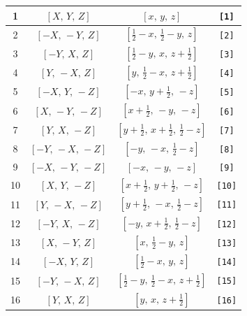 \documentclass[fleqn,8pt]{jsarticle}
\begin{document}
\begin{longtable}{cccc}
1 & $\left[ X,\, Y,\, Z \right]$ & $\left[ x,\, y,\, z \right]$ & {\tt [1]} \\ \hline
2 & $\left[ - X,\, - Y,\, Z \right]$ & $\left[ \frac{1}{2} - x,\, \frac{1}{2} - y,\, z \right]$ & {\tt [2]} \\ \hline
3 & $\left[ - Y,\, X,\, Z \right]$ & $\left[ \frac{1}{2} - y,\, x,\, z + \frac{1}{2} \right]$ & {\tt [3]} \\ \hline
4 & $\left[ Y,\, - X,\, Z \right]$ & $\left[ y,\, \frac{1}{2} - x,\, z + \frac{1}{2} \right]$ & {\tt [4]} \\ \hline
5 & $\left[ - X,\, Y,\, - Z \right]$ & $\left[ - x,\, y + \frac{1}{2},\, - z \right]$ & {\tt [5]} \\ \hline
6 & $\left[ X,\, - Y,\, - Z \right]$ & $\left[ x + \frac{1}{2},\, - y,\, - z \right]$ & {\tt [6]} \\ \hline
7 & $\left[ Y,\, X,\, - Z \right]$ & $\left[ y + \frac{1}{2},\, x + \frac{1}{2},\, \frac{1}{2} - z \right]$ & {\tt [7]} \\ \hline
8 & $\left[ - Y,\, - X,\, - Z \right]$ & $\left[ - y,\, - x,\, \frac{1}{2} - z \right]$ & {\tt [8]} \\ \hline
9 & $\left[ - X,\, - Y,\, - Z \right]$ & $\left[ - x,\, - y,\, - z \right]$ & {\tt [9]} \\ \hline
10 & $\left[ X,\, Y,\, - Z \right]$ & $\left[ x + \frac{1}{2},\, y + \frac{1}{2},\, - z \right]$ & {\tt [10]} \\ \hline
11 & $\left[ Y,\, - X,\, - Z \right]$ & $\left[ y + \frac{1}{2},\, - x,\, \frac{1}{2} - z \right]$ & {\tt [11]} \\ \hline
12 & $\left[ - Y,\, X,\, - Z \right]$ & $\left[ - y,\, x + \frac{1}{2},\, \frac{1}{2} - z \right]$ & {\tt [12]} \\ \hline
13 & $\left[ X,\, - Y,\, Z \right]$ & $\left[ x,\, \frac{1}{2} - y,\, z \right]$ & {\tt [13]} \\ \hline
14 & $\left[ - X,\, Y,\, Z \right]$ & $\left[ \frac{1}{2} - x,\, y,\, z \right]$ & {\tt [14]} \\ \hline
15 & $\left[ - Y,\, - X,\, Z \right]$ & $\left[ \frac{1}{2} - y,\, \frac{1}{2} - x,\, z + \frac{1}{2} \right]$ & {\tt [15]} \\ \hline
16 & $\left[ Y,\, X,\, Z \right]$ & $\left[ y,\, x,\, z + \frac{1}{2} \right]$ & {\tt [16]} \\
\end{longtable}
\end{document}
